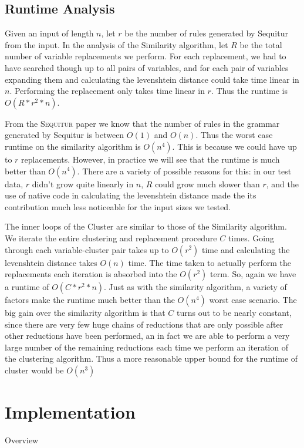 \documentclass[11pt]{article}
\newcommand{\Sequitur}{\textsc{Sequitur}\xspace}
\begin{document}
\subsection{Runtime Analysis}
Given an input of length $n$, let $r$ be the number of rules generated
by Sequitur from the input. 
In the analysis of the Similarity algorithm, let $R$ be the total number of variable
replacements we perform. For each replacement, we had to have searched though
up to all pairs of variables, and for each pair of variables expanding
them and calculating the levenshtein distance could take time linear in $n$.
Performing the replacement only takes time linear in $r$.
Thus the runtime is $\boxed{O(R*r^2*n)}$. 

From the \Sequitur paper \cite{sequitur} we
know that the number of rules in the grammar generated by Sequitur
is between $O(1)$ and $O(n)$. Thus the worst case runtime on the similarity
algorithm is $\boxed{O(n^4)}$. This is because we could have up to $r$ replacements.
However, in practice we will see that the runtime is much better
than $O(n^4)$. There are a variety of possible reasons for this:
in our test data, $r$ didn't grow quite linearly in $n$, $R$ could grow much
slower than $r$, and the use of native code in calculating the levenshtein distance 
made the its contribution much less noticeable for the input sizes we tested.



The inner loops of the Cluster are similar to those of the Similarity algorithm.
We iterate the entire clustering and replacement procedure $C$ times. Going through
each variable-cluster pair takes up to $O(r^2)$ time and calculating the levenshtein
distance takes $O(n)$ time. The time taken to actually perform the replacements each
iteration is absorbed into the $O(r^2)$ term. So, again we have a runtime of
$\boxed{O(C*r^2*n)}$. Just as with the similarity algorithm,
a variety of factors make the runtime much better than the
$\boxed{O(n^4)}$ worst case scenario. 
The big gain over the similarity algorithm is that $C$ turns out
to be nearly constant, since there are very few huge chains of reductions that are
only possible after other reductions have been performed, an in fact we are able to 
perform a very large number of the remaining reductions each time we perform an iteration
of the clustering algorithm. Thus a more reasonable upper bound for the runtime
of cluster would be $\boxed{O(n^3)}$

\section{Implementation}
Overview
\end{document}
